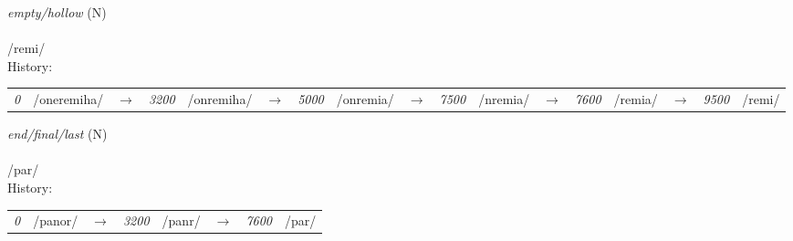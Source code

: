 \vspace{15pt}
\begin{nopagebreak}
 \textit{empty/hollow} (N)\\
\\
\noindent /r{\textprimstress}emi/\\


\noindent History:

\vspace{-0pt}
\hspace{40pt}
\begin{tabular}{ccc}
\textit{0} & /oneremiha/&$\rightarrow$ & \textit{3200} & /onremiha/&$\rightarrow$ & \textit{5000} & /onremia/&$\rightarrow$ & \textit{7500} & /nremia/&$\rightarrow$ & \textit{7600} & /remia/&$\rightarrow$ & \textit{9500} & /remi/& \\
\end{tabular}

\vspace{20pt}\hline

\end{nopagebreak}
\filbreak



\vspace{15pt}
\begin{nopagebreak}
 \textit{end/final/last} (N)\\
\\
\noindent /p{\textprimstress}ar/\\


\noindent History:

\vspace{-0pt}
\hspace{40pt}
\begin{tabular}{ccc}
\textit{0} & /panor/&$\rightarrow$ & \textit{3200} & /panr/&$\rightarrow$ & \textit{7600} & /par/& \\
\end{tabular}

\vspace{20pt}\hline

\end{nopagebreak}
\filbreak



